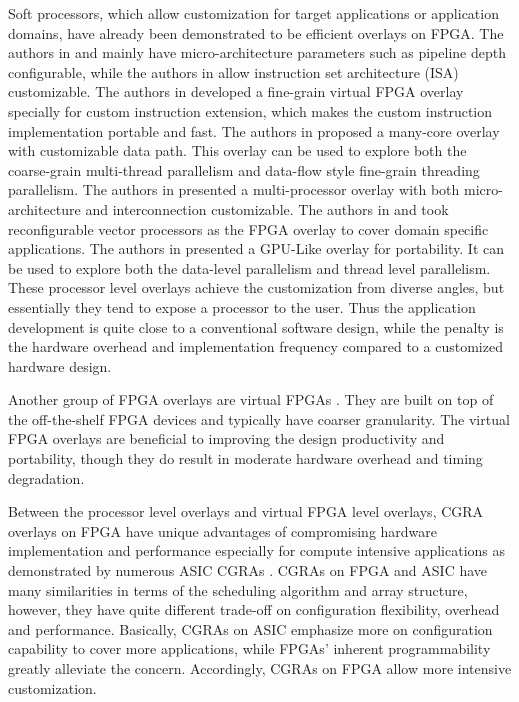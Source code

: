 Soft processors, which allow customization for target applications or application domains, have already been demonstrated to be efficient overlays on FPGA. The authors in \cite{Yiannacouras2007Exploration} \cite{microblaze} and \cite{nios} mainly have micro-architecture parameters such as pipeline depth configurable, while the authors in \cite{grad2009woolcano} allow instruction set architecture (ISA) customizable. The authors in \cite{Kock2013CI} developed a fine-grain virtual FPGA overlay specially for custom instruction extension, which makes the custom instruction implementation portable and fast. The authors in \cite{Lebedev2010} proposed a many-core overlay with customizable data path. This overlay can be used to explore both the coarse-grain multi-thread parallelism and data-flow style fine-grain threading parallelism. The authors in \cite{unnikrishnan2009application} presented a multi-processor overlay with both micro-architecture and interconnection customizable. The authors in \cite{Guy2012VENICE} and \cite {Yiannacouras2009FPS} took reconfigurable vector processors as the FPGA overlay to cover domain specific applications. The authors in \cite{Jeffrey2011potential} presented a GPU-Like overlay for portability. It can be used to explore both the data-level parallelism and thread level parallelism. These processor level overlays achieve the customization from diverse angles, but essentially they tend to expose a processor to the user. Thus the application development is quite close to a conventional software design, while the penalty is the hardware overhead and implementation frequency compared to a customized hardware design.    

Another group of FPGA overlays are virtual FPGAs \cite{zuma2013carl} \cite{Grant2011Malibu} \cite{Coole2010Intermediate}. They are built on top of the off-the-shelf FPGA devices and typically have coarser granularity. The virtual FPGA overlays are beneficial to improving the design productivity and portability, though they do result in moderate hardware overhead and timing degradation.   

Between the processor level overlays and virtual FPGA level overlays, CGRA overlays on FPGA have unique advantages of compromising hardware implementation and performance especially for compute intensive applications as demonstrated by numerous ASIC CGRAs \cite{tessier2001reconfigurable} \cite{compton2002reconfigurable}. CGRAs on FPGA and ASIC have many similarities in terms of the scheduling algorithm and array structure, however, they have quite different trade-off on configuration flexibility, overhead and performance. Basically, CGRAs on ASIC emphasize more on configuration capability to cover more applications, while FPGAs' inherent programmability greatly alleviate the concern. Accordingly, CGRAs on FPGA allow more intensive customization. 

